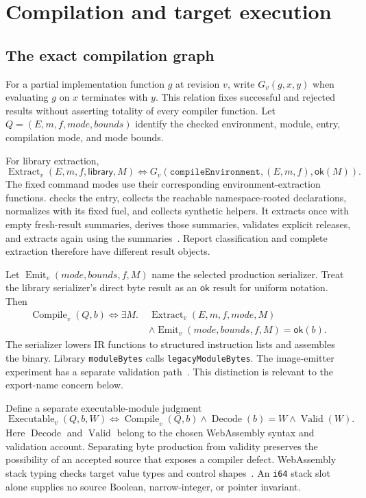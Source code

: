 \documentclass[11pt]{article}
\newcommand{\code}[1]{\texttt{#1}}
\newcommand{\longcode}[1]{\texttt{\seqsplit{#1}}}
\newcommand{\ty}[1]{\mathsf{#1}}
\newcommand{\ok}{\mathsf{ok}}
\begin{document}
\section{Compilation and target execution}

\subsection{The exact compilation graph}

For a partial implementation function $g$ at revision $v$, write $G_v(g,x,y)$ when evaluating $g$ on $x$ terminates with $y$.  This relation fixes successful and rejected results without asserting totality of every compiler function.  Let $Q=(E,m,f,\mathit{mode},\mathit{bounds})$ identify the checked environment, module, entry, compilation mode, and mode bounds.

For library extraction,
\[
\operatorname{Extract}_v(E,m,f,\ty{library},M)
\iff G_v(\code{compileEnvironment},(E,m,f),\ok(M)).
\]
The fixed command modes use their corresponding environment-extraction functions.  \longcode{compileEnvironmentWithEntryModeDetailed} checks the entry, collects the reachable namespace-rooted declarations, normalizes with its fixed fuel, and collects synthetic helpers.  It extracts once with empty fresh-result summaries, derives those summaries, validates explicit releases, and extracts again using the summaries~\cite{extract}.  Report classification and complete extraction therefore have different result objects.

Let $\operatorname{Emit}_v(\mathit{mode},\mathit{bounds},f,M)$ name the selected production serializer.  Treat the library serializer's direct byte result as an $\ok$ result for uniform notation.  Then
\begin{align*}
\operatorname{Compile}_v(Q,b)\iff\exists M.\;&
\operatorname{Extract}_v(E,m,f,\mathit{mode},M)\\
&\land\operatorname{Emit}_v(\mathit{mode},\mathit{bounds},f,M)=\ok(b).
\end{align*}
The serializer lowers IR functions to structured instruction lists and assembles the binary.  Library \code{moduleBytes} calls \code{legacyModuleBytes}.  The image-emitter experiment has a separate validation path~\cite{binary}.  This distinction is relevant to the export-name concern below.

Define a separate executable-module judgment
\[
\operatorname{Executable}_v(Q,b,W)
\iff\operatorname{Compile}_v(Q,b)\land\operatorname{Decode}(b)=W
       \land\operatorname{Valid}(W).
\]
Here $\operatorname{Decode}$ and $\operatorname{Valid}$ belong to the chosen WebAssembly syntax and validation account.  Separating byte production from validity preserves the possibility of an accepted source that exposes a compiler defect.  WebAssembly stack typing checks target value types and control shapes~\cite{wasm}.  An \code{i64} stack slot alone supplies no source Boolean, narrow-integer, or pointer invariant.
\end{document}
